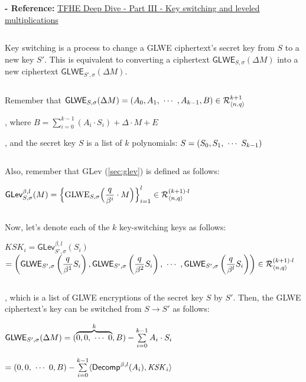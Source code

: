 \textbf{- Reference:} 
\href{https://www.zama.ai/post/tfhe-deep-dive-part-3}{TFHE Deep Dive - Part III - Key switching and leveled multiplications}~\cite{tfhe-3}

$ $

Key switching is a process to change a GLWE ciphertext's secret key from $S$ to a new key $S'$. This is equivalent to converting a ciphertext $\textsf{GLWE}_{S,\sigma}(\Delta M)$ into a new ciphertext $\textsf{GLWE}_{S',\sigma}(\Delta M)$. 

$ $

\noindent Remember that $\textsf{GLWE}_{S,\sigma}(\Delta M) = (A_0, A_1, \text{ } \text{$\cdots$} \text{ } , A_{k-1}, B) \in \mathcal{R}_{\langle n, q \rangle }^{k + 1}$

, where $B = \sum\limits_{i=0}^{k-1}{(A_i \cdot S_i)} + \Delta \cdot M + E$

, and the secret key $S$ is a list of $k$ polynomials: $S = (S_0, S_1, \text{ } \text{$\cdots$} \text{ } S_{k-1})$

$ $

\noindent Also, remember that GLev (\autoref{sec:glev}) is defined as follows: 

$\textsf{GLev}_{S, \sigma}^{\beta, l}(M) = \Bigl \{\text{GLWE}_{S, \sigma}\Bigl (\dfrac{q}{\beta^i} \cdot M \Bigr ) \Bigr \}_{i=1}^{l} \in \mathcal{R}_{\langle n, q \rangle }^{(k+1) \cdot l}$

$ $

\noindent Now, let's denote each of the $k$ key-switching keys as follows:

$\mathit{KSK}_i = \textsf{GLev}_{S', \sigma}^{\beta, l}(S_i)$ \\
$ = \left ( \textsf{GLWE}_{S', \sigma} \left ( 
 \dfrac{q}{\beta^1}S_i \right ), \textsf{GLWE}_{S', \sigma} \left ( 
 \dfrac{q}{\beta^2}S_i \right ), \text{ } \text{$\cdots$} \text{ }, \textsf{GLWE}_{S', \sigma} \left ( 
 \dfrac{q}{\beta^l}S_i \right ) \right ) \in \mathcal{R}_{\langle n, q \rangle }^{(k + 1) \cdot l}$

$ $

\noindent, which is a list of GLWE encryptions of the secret key $S$ by $S'$. Then, the GLWE ciphertext's key can be switched from $S \rightarrow S'$ as follows: 


\begin{tcolorbox}[title={\textbf{\tboxlabel{\ref*{sec:glwe-key-switching}} GLWE Key Switching}}]
$\textsf{GLWE}_{S',\sigma}(\Delta M) = (\overbrace{0, 0, \text{ } \text{$\cdots$} \text{ } 0}^k, B) - \sum \limits_{i=0}^{k-1} A_i \cdot S_i$

\text{ } \text{ } $ = (0, 0, \text{ } \text{$\cdots$} \text{ } 0, B) - \sum \limits_{i=0}^{k-1} \langle \textsf{Decomp}^{\beta, l}(A_i), \mathit{KSK}_i \rangle$
\end{tcolorbox}



